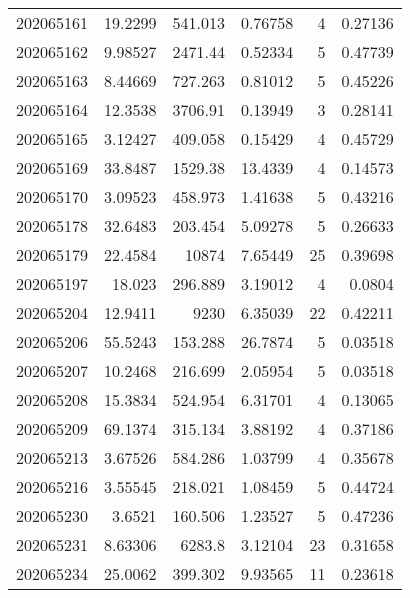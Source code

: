 \begin{tabular}{rrrrrr}
 202065161 &         19.2299  &      541.013  &            0.76758 &           4 & 0.27136 \\
 202065162 &          9.98527 &     2471.44   &            0.52334 &           5 & 0.47739 \\
 202065163 &          8.44669 &      727.263  &            0.81012 &           5 & 0.45226 \\
 202065164 &         12.3538  &     3706.91   &            0.13949 &           3 & 0.28141 \\
 202065165 &          3.12427 &      409.058  &            0.15429 &           4 & 0.45729 \\
 202065169 &         33.8487  &     1529.38   &           13.4339  &           4 & 0.14573 \\
 202065170 &          3.09523 &      458.973  &            1.41638 &           5 & 0.43216 \\
 202065178 &         32.6483  &      203.454  &            5.09278 &           5 & 0.26633 \\
 202065179 &         22.4584  &    10874      &            7.65449 &          25 & 0.39698 \\
 202065197 &         18.023   &      296.889  &            3.19012 &           4 & 0.0804  \\
 202065204 &         12.9411  &     9230      &            6.35039 &          22 & 0.42211 \\
 202065206 &         55.5243  &      153.288  &           26.7874  &           5 & 0.03518 \\
 202065207 &         10.2468  &      216.699  &            2.05954 &           5 & 0.03518 \\
 202065208 &         15.3834  &      524.954  &            6.31701 &           4 & 0.13065 \\
 202065209 &         69.1374  &      315.134  &            3.88192 &           4 & 0.37186 \\
 202065213 &          3.67526 &      584.286  &            1.03799 &           4 & 0.35678 \\
 202065216 &          3.55545 &      218.021  &            1.08459 &           5 & 0.44724 \\
 202065230 &          3.6521  &      160.506  &            1.23527 &           5 & 0.47236 \\
 202065231 &          8.63306 &     6283.8    &            3.12104 &          23 & 0.31658 \\
 202065234 &         25.0062  &      399.302  &            9.93565 &          11 & 0.23618 \\

\end{tabular}
